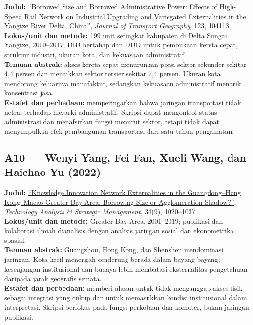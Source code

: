 \documentclass[
  indonesian,
  11pt,
  a4paper,
  oneside,
  openany]{report}
\begin{document}
\textbf{Judul:}
\href{https://doi.org/10.1016/j.jtrangeo.2025.104113}{``Borrowed Size
and Borrowed Administrative Power: Effects of High-Speed Rail Network on
Industrial Upgrading and Variegated Externalities in the Yangtze River
Delta, China''}, \emph{Journal of Transport Geography}, 123, 104113.\\
\textbf{Lokus/unit dan metode:} 199 unit setingkat kabupaten di Delta
Sungai Yangtze, 2000--2017; DID bertahap dan DDD untuk pembukaan kereta
cepat, struktur industri, ukuran kota, dan kekuasaan administratif.\\
\textbf{Temuan abstrak:} akses kereta cepat menurunkan porsi sektor
sekunder sekitar 4,4 persen dan menaikkan sektor tersier sekitar 7,4
persen. Ukuran kota mendorong keluarnya manufaktur, sedangkan kekuasaan
administratif menarik konsentrasi jasa.\\
\textbf{Estafet dan perbedaan:} memperingatkan bahwa jaringan
transportasi tidak netral terhadap hierarki administratif. Skripsi dapat
mengontrol status administrasi dan menafsirkan fungsi menurut sektor,
tetapi tidak dapat menyimpulkan efek pembangunan transportasi dari satu
tahun pengamatan.

\subsection{A10 --- Wenyi Yang, Fei Fan, Xueli Wang, dan Haichao Yu
(2022)}\label{a10-wenyi-yang-fei-fan-xueli-wang-dan-haichao-yu-2022}

\textbf{Judul:}
\href{https://doi.org/10.1080/09537325.2021.1940922}{``Knowledge
Innovation Network Externalities in the Guangdong--Hong Kong--Macao
Greater Bay Area: Borrowing Size or Agglomeration Shadow?''},
\emph{Technology Analysis \& Strategic Management}, 34(9), 1020--1037.\\
\textbf{Lokus/unit dan metode:} Greater Bay Area, 2001--2019; publikasi
dan kolaborasi ilmiah dianalisis dengan analisis jaringan sosial dan
ekonometrika spasial.\\
\textbf{Temuan abstrak:} Guangzhou, Hong Kong, dan Shenzhen mendominasi
jaringan. Kota kecil-menengah cenderung berada dalam bayang-bayang;
kesenjangan institusional dan budaya lebih membatasi eksternalitas
pengetahuan daripada jarak geografis semata.\\
\textbf{Estafet dan perbedaan:} memberi alasan untuk tidak menganggap
akses fisik sebagai integrasi yang cukup dan untuk memasukkan kondisi
institusional dalam interpretasi. Skripsi berfokus pada fungsi perkotaan
dan komuter, bukan jaringan publikasi.
\end{document}
